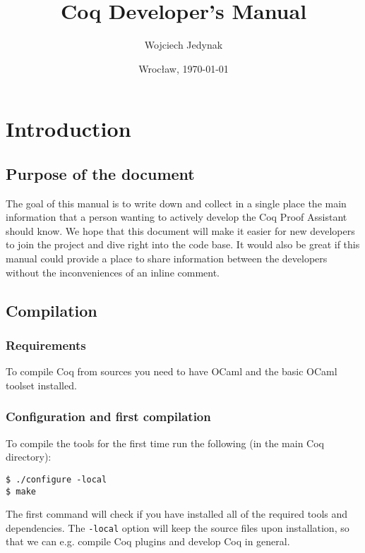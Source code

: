 \documentclass[a4paper,oneside]{book}
\author{Wojciech Jedynak}
\date{Wroc{\l}aw, \today}
\title{Coq Developer's Manual}
\begin{document}
\maketitle

\tableofcontents

\part{Introduction}

\chapter{Purpose of the document}

The goal of this manual is to write down and collect in a single place
the main information that a person wanting to actively develop the Coq
Proof Assistant should know. We hope that this document will make it
easier for new developers to join the project and dive right into the
code base. It would also be great if this manual could provide a place
to share information between the developers without the inconveniences
of an inline comment.

\chapter{Compilation}

\section{Requirements}

To compile Coq from sources you need to have OCaml and the basic OCaml
toolset installed. 

\section{Configuration and first compilation}

To compile the tools for the first time run the following (in the main
Coq directory):

\begin{lstlisting}
$ ./configure -local
$ make
\end{lstlisting}

The first command will check if you have installed all of the required
tools and dependencies. The \verb|-local| option will keep the source
files upon installation, so that we can e.g. compile Coq plugins and
develop Coq in general.
\end{document}

